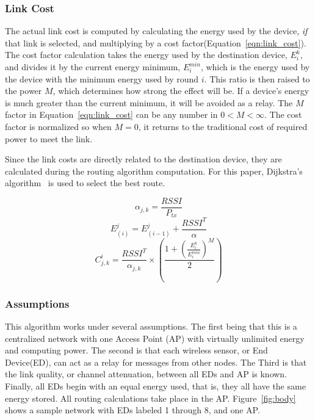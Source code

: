 \documentclass{article}
\begin{document}
\subsubsection{Link Cost}
The actual link cost is computed by calculating the energy used by the device, \emph{if} that link is selected, and multiplying by a cost factor(Equation~\ref{eqn:link_cost}). The cost factor calculation takes the energy used by the destination device, $E^k_i$, and divides it by the current energy minimum, $E^{min}_{i}$, which is the energy used by the device with the minimum energy used by round $i$. This ratio is then raised to the power $M$, which determines how strong the effect will be. If a device's energy is much greater than the current minimum, it will be avoided as a relay.
The $M$ factor in Equation~\ref{eqn:link_cost} can be any number in $0 < M < \infty$. The cost factor is normalized so when $M=0$, it returns to the traditional cost of required power to meet the link.

Since the link costs are directly related to the destination device, they are calculated during the routing algorithm computation. For this paper, Dijkstra's algorithm~\cite{dijkstra:algorithm} is used to select the best route.

\begin{equation}
\label{eqn:alpha}
\alpha_{j,k} = \frac{RSSI}{P_{tx}}
\end{equation}
\begin{equation}
\label{eqn:accumulated_energy}
E^j_{(i)} = E^j_{(i-1)} + \frac{RSSI^T}{\alpha}
\end{equation}
\begin{equation}
\label{eqn:link_cost}
C^i_{j,k} = \frac{RSSI^T}{\alpha_{j,k}} \times \left( \frac{1+\left(\frac{E^k_i}{E^{min}_{i}} \right)^M}{2} \right)
\end{equation}

\subsubsection{Assumptions}
This algorithm works under several assumptions. The first being that this is a centralized network with one Access Point (AP) with virtually unlimited energy and computing power. The second is that each wireless sensor, or End Device(ED), can act as a relay for messages from other nodes. The Third is that the link quality, or channel attenuation, between all EDs and AP is known. Finally, all EDs begin with an equal energy used, that is, they all have the same energy stored. All routing calculations take place in the AP. Figure~\ref{fig:body} shows a sample network with EDs labeled 1 through 8, and one AP.
\end{document}
